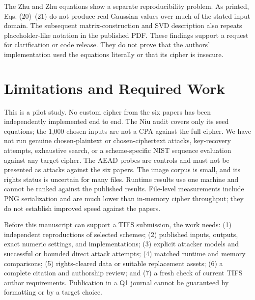 \documentclass[letterpaper,journal]{IEEEtran}
\begin{document}
The Zhu and Zhu equations show a separate reproducibility problem. As printed, Eqs. (20)--(21) do not produce real Gaussian values over much of the stated input domain. The subsequent matrix-construction and SVD description also repeats placeholder-like notation in the published PDF. These findings support a request for clarification or code release. They do not prove that the authors' implementation used the equations literally or that its cipher is insecure.

\section{Limitations and Required Work}
This is a pilot study. No custom cipher from the six papers has been independently implemented end to end. The Niu audit covers only its seed equations; the 1,000 chosen inputs are not a CPA against the full cipher. We have not run genuine chosen-plaintext or chosen-ciphertext attacks, key-recovery attempts, exhaustive search, or a scheme-specific NIST sequence evaluation against any target cipher. The AEAD probes are controls and must not be presented as attacks against the six papers. The image corpus is small, and its rights status is uncertain for many files. Runtime results use one machine and cannot be ranked against the published results. File-level measurements include PNG serialization and are much lower than in-memory cipher throughput; they do not establish improved speed against the papers.

Before this manuscript can support a TIFS submission, the work needs: (1) independent reproductions of selected schemes; (2) published inputs, outputs, exact numeric settings, and implementations; (3) explicit attacker models and successful or bounded direct attack attempts; (4) matched runtime and memory comparisons; (5) rights-cleared data or suitable replacement assets; (6) a complete citation and authorship review; and (7) a fresh check of current TIFS author requirements. Publication in a Q1 journal cannot be guaranteed by formatting or by a target choice.
\end{document}
